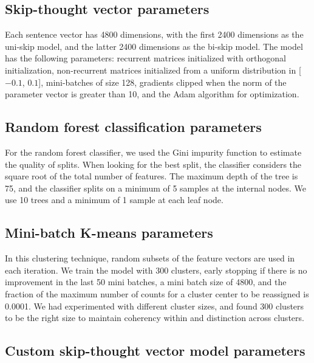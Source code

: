 \documentclass[11pt,a4paper]{article}
\begin{document}
\subsection{Skip-thought vector parameters}
\label{sec:skip-thought-parameters}

Each sentence vector has 4800 dimensions, with the first 2400 dimensions as the uni-skip model, and the latter 2400 dimensions as the bi-skip model. The model has the following parameters: recurrent matrices initialized with orthogonal initialization, non-recurrent matrices initialized from a uniform distribution in [$-0.1$, $0.1$], mini-batches of size 128, gradients clipped when the norm of the parameter vector is greater than 10, and the Adam algorithm for optimization.

\subsection{Random forest classification parameters}
\label{sec:random-forest-parameters}

For the random forest classifier, we used the Gini impurity function to estimate the quality of splits. When looking for the best split, the classifier considers the square root of the total number of features. The maximum depth of the tree is 75, and the classifier splits on a minimum of 5 samples at the internal nodes. We use 10 trees and a minimum of 1 sample at each leaf node.

\subsection{Mini-batch K-means parameters}
\label{k-means-parameters}

In this clustering technique, random subsets of the feature vectors are used in each iteration. We train the model with 300 clusters, early stopping if there is no improvement in the last 50 mini batches, a mini batch size of 4800, and the fraction of the maximum number of counts for a cluster center to be reassigned is 0.0001. We had experimented with different cluster sizes, and found 300 clusters to be the right size to maintain coherency within and distinction across clusters.

\subsection{Custom skip-thought vector model parameters}
\label{custom-skip-thought-parameters}
\end{document}
